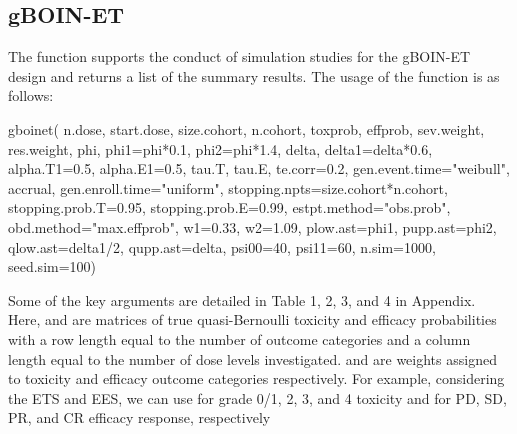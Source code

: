 \subsection{gBOIN-ET}
The  function supports the conduct of simulation studies for the gBOIN-ET design and returns a list of the summary results. The usage of the  function is as follows:
\begin{example}
gboinet(
  n.dose, start.dose, size.cohort, n.cohort,
  toxprob, effprob, sev.weight, res.weight,
  phi, phi1=phi*0.1, phi2=phi*1.4, delta, delta1=delta*0.6,
  alpha.T1=0.5, alpha.E1=0.5, tau.T, tau.E,
  te.corr=0.2, gen.event.time="weibull",
  accrual, gen.enroll.time="uniform",
  stopping.npts=size.cohort*n.cohort,
  stopping.prob.T=0.95, stopping.prob.E=0.99,
  estpt.method="obs.prob", obd.method="max.effprob",
  w1=0.33, w2=1.09,
  plow.ast=phi1, pupp.ast=phi2, qlow.ast=delta1/2, qupp.ast=delta,
  psi00=40, psi11=60,
  n.sim=1000, seed.sim=100)
\end{example}
Some of the key arguments are detailed in Table 1, 2, 3, and 4 in Appendix. Here,  and  are matrices of true quasi-Bernoulli toxicity and efficacy probabilities with a row length equal to the number of outcome categories and a column length equal to the number of dose levels investigated.  and  are weights assigned to toxicity and efficacy outcome categories respectively. For example, considering the ETS and EES, we can use  for grade 0/1, 2, 3, and 4 toxicity and  for PD, SD, PR, and CR efficacy response, respectively

